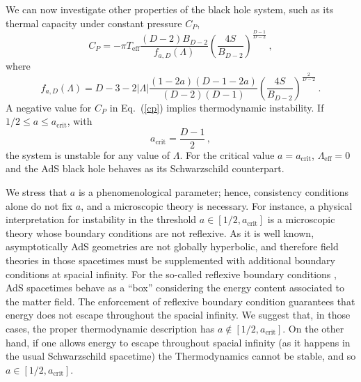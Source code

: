 \documentclass[prd,onecolumn,notitlepage,amsmath,nofootinbib,superscriptaddress,showpacs,showkeys]{revtex4-1}
\begin{document}
We can now investigate other properties of the black hole system,
such as its thermal capacity under constant pressure $C_{P}$, 
\begin{equation}
C_{P}=-\pi T_{\mathrm{eff}}\frac{\left(D-2\right)B_{D-2}}{f_{a,D}\left(\Lambda\right)}\left(\frac{4S}{B_{D-2}}\right)^{\frac{D-1}{D-2}}~,\label{cp}
\end{equation}
where 
\begin{equation}
f_{a,D}\left(\Lambda\right)=D-3-2\left|\Lambda\right|\frac{\left(1-2a\right)\left(D-1-2a\right)}{\left(D-2\right)\left(D-1\right)}\left(\frac{4S}{B_{D-2}}\right)^{\frac{2}{D-2}}~.
\end{equation}
A negative value for $C_{P}$ in Eq.~(\ref{cp}) implies thermodynamic
instability. If $1/2\leq a\leq a_{\mathrm{crit}}$, with 
\begin{equation}
a_{\mathrm{crit}}=\frac{D-1}{2}\,,\label{a_ext}
\end{equation}
the system is unstable for any value of $\Lambda$. For the critical
value $a=a_{\mathrm{crit}}$, $\Lambda_{\mathrm{eff}}=0$ and the
AdS black hole behaves as its Schwarzschild counterpart.

We stress that $a$ is a phenomenological parameter; hence, consistency
conditions alone do not fix $a$, and a microscopic theory is necessary.
For instance, a physical interpretation for instability in the threshold
$a\in\left[1/2,a_{\mathrm{crit}}\right]$ is a microscopic theory
whose boundary conditions are not reflexive. As it is well known,
asymptotically AdS geometries are not globally hyperbolic, and therefore
field theories in those spacetimes must be supplemented with additional
boundary conditions at spacial infinity. For the so-called reflexive
boundary conditions \cite{Avis,Ishibashi}, AdS spacetimes behave
as a ``box'' considering the energy content associated to the matter
field. The enforcement of reflexive boundary condition guarantees
that energy does not escape throughout the spacial infinity. We suggest
that, in those cases, the proper thermodynamic description has $a\notin\left[1/2,a_{\mathrm{crit}}\right]$.
On the other hand, if one allows energy to escape throughout spacial
infinity (as it happens in the usual Schwarzschild spacetime) the
Thermodynamics cannot be stable, and so $a\in\left[1/2,a_{\mathrm{crit}}\right]$.
\end{document}
